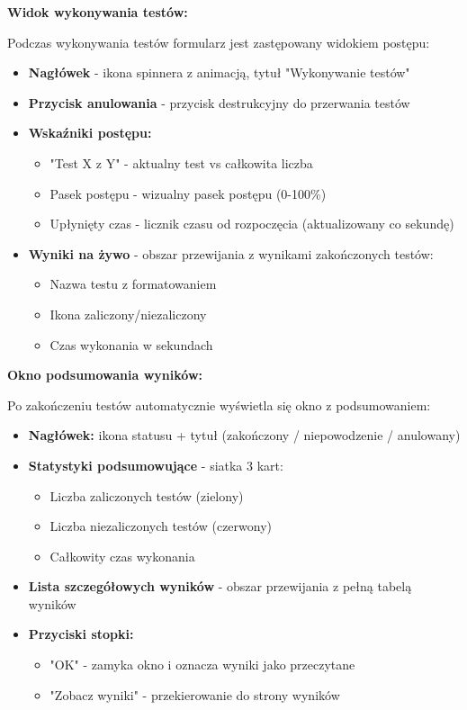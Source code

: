 \documentclass[12pt,a4paper]{article}
\begin{document}
\textbf{Widok wykonywania testów:}

Podczas wykonywania testów formularz jest zastępowany widokiem postępu:
\begin{itemize}
    \item \textbf{Nagłówek} - ikona spinnera z animacją, tytuł "Wykonywanie testów"
    \item \textbf{Przycisk anulowania} - przycisk destrukcyjny do przerwania testów
    \item \textbf{Wskaźniki postępu:}
    \begin{itemize}
        \item "Test X z Y" - aktualny test vs całkowita liczba
        \item Pasek postępu - wizualny pasek postępu (0-100\%)
        \item Upłynięty czas - licznik czasu od rozpoczęcia (aktualizowany co sekundę)
    \end{itemize}
    \item \textbf{Wyniki na żywo} - obszar przewijania z wynikami zakończonych testów:
    \begin{itemize}
        \item Nazwa testu z formatowaniem
        \item Ikona zaliczony/niezaliczony
        \item Czas wykonania w sekundach
    \end{itemize}
\end{itemize}

\textbf{Okno podsumowania wyników:}

Po zakończeniu testów automatycznie wyświetla się okno z podsumowaniem:
\begin{itemize}
    \item \textbf{Nagłówek:} ikona statusu + tytuł (zakończony / niepowodzenie / anulowany)
    \item \textbf{Statystyki podsumowujące} - siatka 3 kart:
    \begin{itemize}
        \item Liczba zaliczonych testów (zielony)
        \item Liczba niezaliczonych testów (czerwony)
        \item Całkowity czas wykonania
    \end{itemize}
    \item \textbf{Lista szczegółowych wyników} - obszar przewijania z pełną tabelą wyników
    \item \textbf{Przyciski stopki:}
    \begin{itemize}
        \item "OK" - zamyka okno i oznacza wyniki jako przeczytane
        \item "Zobacz wyniki" - przekierowanie do strony wyników
    \end{itemize}
\end{itemize}
\end{document}
